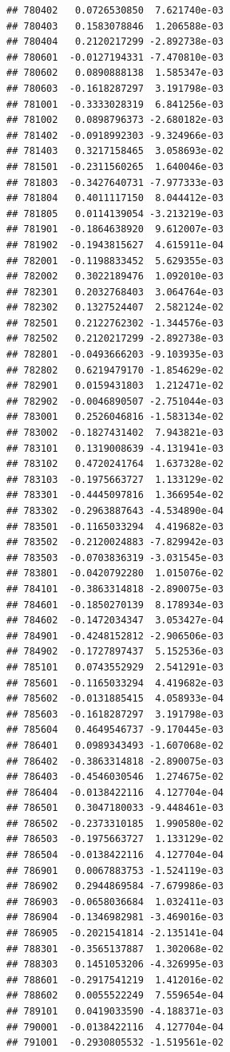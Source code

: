 \begin{frame}[fragile]
\begin{verbatim}
## 780402   0.0726530850  7.621740e-03
## 780403   0.1583078846  1.206588e-03
## 780404   0.2120217299 -2.892738e-03
## 780601  -0.0127194331 -7.470810e-03
## 780602   0.0890888138  1.585347e-03
## 780603  -0.1618287297  3.191798e-03
## 781001  -0.3333028319  6.841256e-03
## 781002   0.0898796373 -2.680182e-03
## 781402  -0.0918992303 -9.324966e-03
## 781403   0.3217158465  3.058693e-02
## 781501  -0.2311560265  1.640046e-03
## 781803  -0.3427640731 -7.977333e-03
## 781804   0.4011117150  8.044412e-03
## 781805   0.0114139054 -3.213219e-03
## 781901  -0.1864638920  9.612007e-03
## 781902  -0.1943815627  4.615911e-04
## 782001  -0.1198833452  5.629355e-03
## 782002   0.3022189476  1.092010e-03
## 782301   0.2032768403  3.064764e-03
## 782302   0.1327524407  2.582124e-02
## 782501   0.2122762302 -1.344576e-03
## 782502   0.2120217299 -2.892738e-03
## 782801  -0.0493666203 -9.103935e-03
## 782802   0.6219479170 -1.854629e-02
## 782901   0.0159431803  1.212471e-02
## 782902  -0.0046890507 -2.751044e-03
## 783001   0.2526046816 -1.583134e-02
## 783002  -0.1827431402  7.943821e-03
## 783101   0.1319008639 -4.131941e-03
## 783102   0.4720241764  1.637328e-02
## 783103  -0.1975663727  1.133129e-02
## 783301  -0.4445097816  1.366954e-02
## 783302  -0.2963887643 -4.534890e-04
## 783501  -0.1165033294  4.419682e-03
## 783502  -0.2120024883 -7.829942e-03
## 783503  -0.0703836319 -3.031545e-03
## 783801  -0.0420792280  1.015076e-02
## 784101  -0.3863314818 -2.890075e-03
## 784601  -0.1850270139  8.178934e-03
## 784602  -0.1472034347  3.053427e-04
## 784901  -0.4248152812 -2.906506e-03
## 784902  -0.1727897437  5.152536e-03
## 785101   0.0743552929  2.541291e-03
## 785601  -0.1165033294  4.419682e-03
## 785602  -0.0131885415  4.058933e-04
## 785603  -0.1618287297  3.191798e-03
## 785604   0.4649546737 -9.170445e-03
## 786401   0.0989343493 -1.607068e-02
## 786402  -0.3863314818 -2.890075e-03
## 786403  -0.4546030546  1.274675e-02
## 786404  -0.0138422116  4.127704e-04
## 786501   0.3047180033 -9.448461e-03
## 786502  -0.2373310185  1.990580e-02
## 786503  -0.1975663727  1.133129e-02
## 786504  -0.0138422116  4.127704e-04
## 786901   0.0067883753 -1.524119e-03
## 786902   0.2944869584 -7.679986e-03
## 786903  -0.0658036684  1.032411e-03
## 786904  -0.1346982981 -3.469016e-03
## 786905  -0.2021541814 -2.135141e-04
## 788301  -0.3565137887  1.302068e-02
## 788303   0.1451053206 -4.326995e-03
## 788601  -0.2917541219  1.412016e-02
## 788602   0.0055522249  7.559654e-04
## 789101   0.0419033590 -4.188371e-03
## 790001  -0.0138422116  4.127704e-04
## 791001  -0.2930805532 -1.519561e-02

\end{verbatim}
\end{frame}
